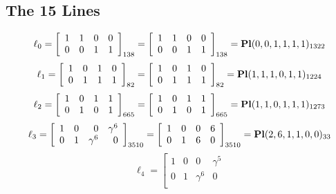 \documentclass{article}
\begin{document}
{\subsection*{The 15 Lines}
$$
\ell_{0} = 
\left[
\begin{array}{*{4}{r}}
1 & 1 & 0 & 0\\
0 & 0 & 1 & 1\\
\end{array}
\right]
_{138}
=
\left[
\begin{array}{*{4}c}
1  & 1  & 0  & 0\\
0  & 0  & 1  & 1\\
\end{array}
\right]_{138}
={\rm\bf Pl}(0,0,1,1,1,1 )_{1322}$$
$$
\ell_{1} = 
\left[
\begin{array}{*{4}{r}}
1 & 0 & 1 & 0\\
0 & 1 & 1 & 1\\
\end{array}
\right]
_{82}
=
\left[
\begin{array}{*{4}c}
1  & 0  & 1  & 0\\
0  & 1  & 1  & 1\\
\end{array}
\right]_{82}
={\rm\bf Pl}(1,1,1,0,1,1 )_{1224}$$
$$
\ell_{2} = 
\left[
\begin{array}{*{4}{r}}
1 & 0 & 1 & 1\\
0 & 1 & 0 & 1\\
\end{array}
\right]
_{665}
=
\left[
\begin{array}{*{4}c}
1  & 0  & 1  & 1\\
0  & 1  & 0  & 1\\
\end{array}
\right]_{665}
={\rm\bf Pl}(1,1,0,1,1,1 )_{1273}$$
$$
\ell_{3} = 
\left[
\begin{array}{*{4}{r}}
1 & 0 & 0 & \gamma^{6}\\
0 & 1 & \gamma^{6} & 0\\
\end{array}
\right]
_{3510}
=
\left[
\begin{array}{*{4}c}
1  & 0  & 0  & 6\\
0  & 1  & 6  & 0\\
\end{array}
\right]_{3510}
={\rm\bf Pl}(2,6,1,1,0,0 )_{33}$$
$$
\ell_{4} = 
\left[
\begin{array}{*{4}{r}}
1 & 0 & 0 & \gamma^{5}\\
0 & 1 & \gamma^{6} & 0\\

\end{array}$$}
\end{document}
